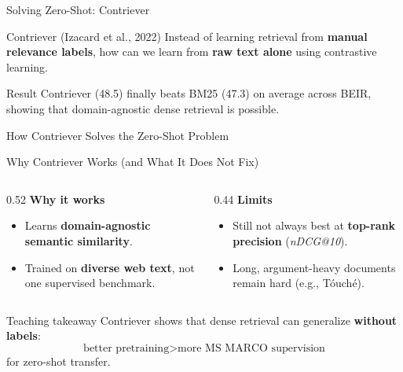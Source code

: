 \documentclass[aspectratio=169]{beamer}
\newif\ifanimated
\newcommand{\cpause}{\ifanimated\pause\fi}
\begin{document}
\begin{frame}{Solving Zero-Shot: Contriever}
\begin{block}{Contriever (Izacard et al., 2022)}
Instead of learning retrieval from \textbf{manual relevance labels},
how can we learn from \textbf{raw text alone} using contrastive learning.
\end{block}

\vspace{1em}
\cpause

\begin{exampleblock}{Result}
Contriever (48.5) finally beats BM25 (47.3) on average across BEIR, showing that domain-agnostic dense retrieval is possible.
\end{exampleblock}
\end{frame}

\begin{frame}[shrink=15]{How Contriever Solves the Zero-Shot Problem}
\begin{center}

\end{center}
\end{frame}

\begin{frame}[shrink=5]{Why Contriever Works (and What It Does Not Fix)}
\begin{columns}[T]
\begin{column}{0.52\textwidth}
\textbf{Why it works}
\begin{itemize}
    \item Learns \textbf{domain-agnostic semantic similarity}.
    \item Trained on \textbf{diverse web text}, not one supervised benchmark.
\end{itemize}
\end{column}

\begin{column}{0.44\textwidth}
\textbf{Limits}
\begin{itemize}
    \item Still not always best at \textbf{top-rank precision} (\textit{nDCG@10}).
    \item Long, argument-heavy documents remain hard (e.g., T{\'o}uch{\'e}).
\end{itemize}
\end{column}
\end{columns}

\vspace{0.8em}
\cpause

\begin{exampleblock}{Teaching takeaway}
Contriever shows that dense retrieval can generalize \textbf{without labels}:
\[
\text{better pretraining} > \text{more MS MARCO supervision}
\]
for zero-shot transfer.
\end{exampleblock}
\end{frame}
\end{document}
